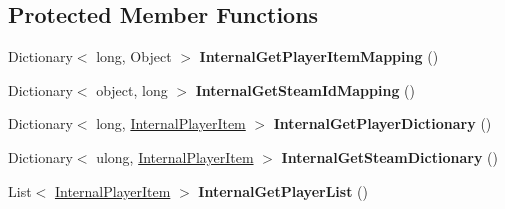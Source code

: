 \subsection*{Protected Member Functions}
\begin{DoxyCompactItemize}
\item 
\hypertarget{class_s_e_mod_a_p_i_internal_1_1_a_p_i_1_1_common_1_1_player_map_a4011c7d7fb83d10b02a526e78ea25a26}{}Dictionary$<$ long, Object $>$ {\bfseries Internal\+Get\+Player\+Item\+Mapping} ()\label{class_s_e_mod_a_p_i_internal_1_1_a_p_i_1_1_common_1_1_player_map_a4011c7d7fb83d10b02a526e78ea25a26}

\item 
\hypertarget{class_s_e_mod_a_p_i_internal_1_1_a_p_i_1_1_common_1_1_player_map_a44ebe47062d6366ecb3e29548664735c}{}Dictionary$<$ object, long $>$ {\bfseries Internal\+Get\+Steam\+Id\+Mapping} ()\label{class_s_e_mod_a_p_i_internal_1_1_a_p_i_1_1_common_1_1_player_map_a44ebe47062d6366ecb3e29548664735c}

\item 
\hypertarget{class_s_e_mod_a_p_i_internal_1_1_a_p_i_1_1_common_1_1_player_map_aa699584f88493ce02a9bb403c23d895c}{}Dictionary$<$ long, \hyperlink{struct_s_e_mod_a_p_i_internal_1_1_a_p_i_1_1_common_1_1_player_map_1_1_internal_player_item}{Internal\+Player\+Item} $>$ {\bfseries Internal\+Get\+Player\+Dictionary} ()\label{class_s_e_mod_a_p_i_internal_1_1_a_p_i_1_1_common_1_1_player_map_aa699584f88493ce02a9bb403c23d895c}

\item 
\hypertarget{class_s_e_mod_a_p_i_internal_1_1_a_p_i_1_1_common_1_1_player_map_ae560485e7c16ecc73bf33ec4628f726f}{}Dictionary$<$ ulong, \hyperlink{struct_s_e_mod_a_p_i_internal_1_1_a_p_i_1_1_common_1_1_player_map_1_1_internal_player_item}{Internal\+Player\+Item} $>$ {\bfseries Internal\+Get\+Steam\+Dictionary} ()\label{class_s_e_mod_a_p_i_internal_1_1_a_p_i_1_1_common_1_1_player_map_ae560485e7c16ecc73bf33ec4628f726f}

\item 
\hypertarget{class_s_e_mod_a_p_i_internal_1_1_a_p_i_1_1_common_1_1_player_map_a87967aa084aede8bdc2b6c0541397e6e}{}List$<$ \hyperlink{struct_s_e_mod_a_p_i_internal_1_1_a_p_i_1_1_common_1_1_player_map_1_1_internal_player_item}{Internal\+Player\+Item} $>$ {\bfseries Internal\+Get\+Player\+List} ()\label{class_s_e_mod_a_p_i_internal_1_1_a_p_i_1_1_common_1_1_player_map_a87967aa084aede8bdc2b6c0541397e6e}

\end{DoxyCompactItemize}
